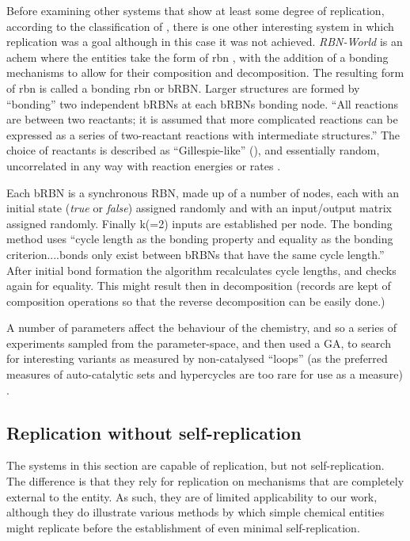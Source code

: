 Before examining other systems that show at least some degree of replication, according to the classification of \textcite{Zachar2010}, there is one other interesting system in which replication was a goal although in this case it was not achieved. \emph{RBN-World} \parencite{Faulconbridge2011} is an \gls{achem} where the entities take the form of \gls{rbn} \parencite{Kauffman:1969ne}, with the addition of a bonding mechanisms to allow for their composition and decomposition. The resulting form of \gls{rbn} is called a bonding \gls{rbn} or bRBN.  Larger structures are formed by ``bonding'' two independent bRBNs at each bRBNs bonding node. ``All reactions are between two reactants; it is assumed that more complicated reactions can be expressed as a series of two-reactant reactions with intermediate structures.'' The choice of reactants is described as ``Gillespie-like'' (\eg \textcite{Gillespie1976}), and essentially random, uncorrelated in any way with reaction energies or rates \parencite[chap.8]{Faulconbridge2011}.

Each bRBN is a synchronous RBN, made up of a number of nodes, each with an initial state (\emph{true} or \emph{false}) assigned randomly and with an input/output matrix assigned randomly. Finally k(=2) inputs are established per node. The bonding method uses ``cycle length as the bonding property and equality as the bonding criterion....bonds only exist between bRBNs that have the same cycle length.'' After initial bond formation the algorithm recalculates cycle lengths, and checks again for equality. This might result then in decomposition (records are kept of composition operations so that the reverse decomposition can be easily done.)

A number of parameters affect the behaviour of the chemistry, and so a series of experiments sampled from the parameter-space, and then used a GA, to search for interesting variants as measured by non-catalysed ``loops'' (as the preferred measures of auto-catalytic sets and \glspl{hypercycle} are too rare for use as a measure) \parencite[chap.8]{Faulconbridge2011}. 

\subsection{Replication without self-replication}\label{sec:replication-without-self-replication}

The systems in this section are capable of replication, but not self-replication. The difference is that they rely for replication on mechanisms that are completely external to the entity. As such, they are of limited applicability to our work, although they do illustrate various methods by which simple chemical entities might replicate before the establishment of even minimal self-replication.

